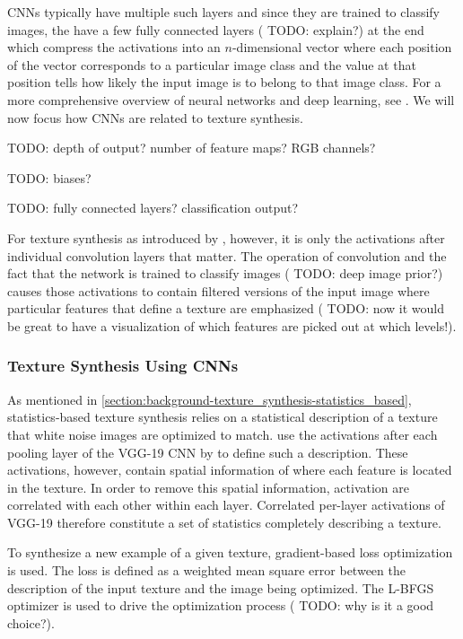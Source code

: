 CNNs typically have multiple such layers and since they are trained to classify images, the have a few fully connected layers ({\color{red} TODO:  explain?}) at the end which compress the activations into an \(n\)-dimensional vector where each position of the vector corresponds to a particular image class and the value at that position tells how likely the input image is to belong to that image class. For a more comprehensive overview of neural networks and deep learning, see \citet{Goodfellow2016}. We will now focus how CNNs are related to texture synthesis.

{\color{red} TODO: depth of output? number of feature maps? RGB channels?}

{\color{red} TODO: biases?}

{\color{red} TODO: fully connected layers? classification output?}

For texture synthesis as introduced by \citet{Gatys2015}, however, it is only the activations after individual convolution layers that matter. The operation of convolution and the fact that the network is trained to classify images ({\color{red} TODO: deep image prior?}) causes those activations to contain filtered versions of the input image where particular features that define a texture are emphasized ({\color{red} TODO: now it would be great to have a visualization of which features are picked out at which levels!}).

\subsubsection{Texture Synthesis Using CNNs}
\label{section:background-texture_synthesis-statistics_based-synthesis_using_cnns}

As mentioned in \ref{section:background-texture_synthesis-statistics_based}, statistics-based texture synthesis relies on a statistical description of a texture that white noise images are optimized to match. \citet{Gatys2015} use the activations after each pooling layer of the VGG-19 CNN by \citet{Simonyan2014} to define such a description. These activations, however, contain spatial information of where each feature is located in the texture. In order to remove this spatial information, activation are correlated with each other within each layer. Correlated per-layer activations of VGG-19 therefore constitute a set of statistics completely describing a texture.

To synthesize a new example of a given texture, gradient-based loss optimization is used. The loss is defined as a weighted mean square error between the description of the input texture and the image being optimized. The L-BFGS optimizer is used to drive the optimization process ({\color{red} TODO: why is it a good choice?}).

